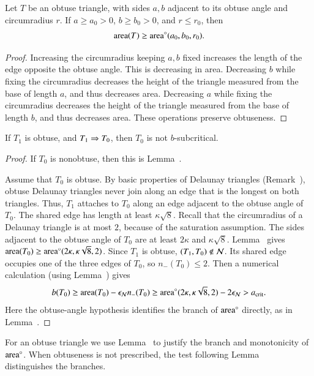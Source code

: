 \begin{lemma}
  Let $T$ be an obtuse triangle, with sides $a,b$ adjacent to its
  obtuse angle and circumradius $r$.  If $a\ge a_0>0$,
  $b\ge b_0>0$, and $r\le r_0$, then
  \[
  {\operatorname{area}}(T)\ge{\operatorname{area}}^\circ(a_0,b_0,r_0).
  \]
\end{lemma}

\begin{proof}
  Increasing the circumradius keeping $a,b$ fixed increases the length of
  the edge opposite the obtuse angle.  This is decreasing in area.
  Decreasing $b$ while fixing the circumradius
  decreases the height of the triangle measured from the base of length $a$,
  and thus decreases area.
  Decreasing $a$ while fixing the circumradius
  decreases the height of the triangle measured from the base of length $b$,
  and thus decreases area.
  These operations preserve obtuseness.
\end{proof}

\begin{lemma}
  If $T_1$ is obtuse, and $T_1 \Rightarrow T_0$, then $T_0$ is not
  $b$-subcritical.
\end{lemma}

\begin{proof}  
  If $T_0$ is nonobtuse, then this is Lemma~.

  Assume that $T_0$ is obtuse.  By basic properties of Delaunay
  triangles (Remark~), obtuse Delaunay triangles never join
  along an edge that is the longest on both triangles.  Thus, $T_1$
  attaches to $T_0$ along an edge adjacent to the obtuse angle of
  $T_0$.  The shared edge has length at least $\kappa\sqrt8$.  
  Recall that the circumradius of a Delaunay triangle is at most $2$,
  because of the saturation assumption.  The sides adjacent to the
  obtuse angle of $T_0$ are at least $2\kappa$ and
  $\kappa\sqrt8$.  Lemma~ gives
  ${\operatorname{area}}(T_0)\ge{\operatorname{area}}^\circ(2\kappa,\kappa\sqrt8,2)$.
  Since $T_1$ is obtuse, $(T_1,T_0)\notin\mathcal N$.  Its shared edge
  occupies one of the three edges of $T_0$, so $n_-(T_0)\le2$.  Then a numerical calculation (using %
  Lemma~) gives
\[
b(T_0) \ge {\operatorname{area}}(T_0) - \epsilon_{\mathcal N} n_-(T_0) \ge 
{\operatorname{area}}^\circ(2\kappa,\kappa\sqrt{8},2) - 2\epsilon_{\mathcal N} > a_\text{crit}.
\] 
Here the obtuse-angle hypothesis identifies the branch of ${\operatorname{area}}^\circ$
directly, as in Lemma~.
\end{proof}

For an obtuse triangle we use Lemma~
to justify the branch and monotonicity of ${\operatorname{area}}^\circ$.  When obtuseness
is not prescribed, the test following Lemma~
distinguishes the branches.

